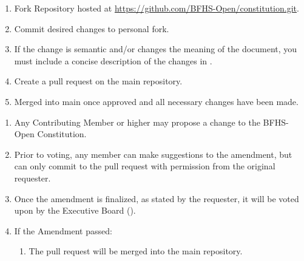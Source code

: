 
\begin{enumerate}
	\item Fork Repository hosted at \href{https://github.com/BFHS-Open/constitution.git}{https://github.com/BFHS-Open/constitution.git}.

	\item Commit desired changes to personal fork.

	\item If the change is semantic and/or changes the meaning of the document,
		you must include a concise description of the changes in .

	\item Create a pull request on the main repository.

	\item Merged into main once approved and all necessary changes have been made.
\end{enumerate}

\begin{enumerate}
	\item Any Contributing Member or higher may propose a change to the BFHS-Open Constitution.

	\item Prior to voting, any member can make suggestions to the amendment, but can
		only commit to the pull request with permission from the original requester.

	\item Once the amendment is finalized, as stated by the requester, it will be voted
		upon by the Executive Board ().

	\item If the Amendment passed:
		\begin{enumerate}
			\item The pull request will be merged into the main repository.
		\end{enumerate}
\end{enumerate}
